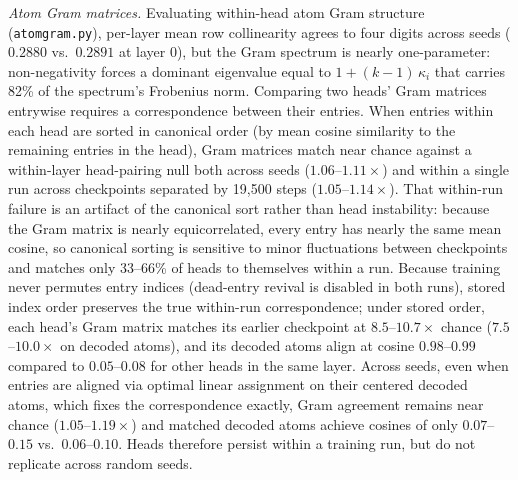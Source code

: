 \emph{Atom Gram matrices.} Evaluating within-head atom Gram structure
(\texttt{atomgram.py}), per-layer mean row collinearity agrees to four
digits across seeds ($0.2880$ vs.\ $0.2891$ at layer 0), but the Gram
spectrum is nearly one-parameter: non-negativity forces a dominant
eigenvalue equal to $1+(k-1)\,\kappa_i$ that carries 82\% of the
spectrum's Frobenius norm. Comparing two heads' Gram matrices entrywise
requires a correspondence between their entries. When entries within each
head are sorted in canonical order (by mean cosine similarity to the
remaining entries in the head), Gram matrices match near chance against a
within-layer head-pairing null both across seeds ($1.06$--$1.11\times$)
and within a single run across checkpoints separated by 19{,}500 steps
($1.05$--$1.14\times$). That within-run failure is an artifact of the
canonical sort rather than head instability: because the Gram matrix is
nearly equicorrelated, every entry has nearly the same mean cosine, so
canonical sorting is sensitive to minor fluctuations between checkpoints
and matches only 33--66\% of heads to themselves within a run. Because
training never permutes entry indices (dead-entry revival is disabled in
both runs), stored index order preserves the true within-run
correspondence; under stored order, each head's Gram matrix matches its
earlier checkpoint at $8.5$--$10.7\times$ chance ($7.5$--$10.0\times$ on
decoded atoms), and its decoded atoms align at cosine $0.98$--$0.99$
compared to $0.05$--$0.08$ for other heads in the same layer. Across
seeds, even when entries are aligned via optimal linear assignment on
their centered decoded atoms, which fixes the correspondence exactly,
Gram agreement remains near chance
($1.05$--$1.19\times$) and matched decoded atoms achieve cosines of only
$0.07$--$0.15$ vs.\ $0.06$--$0.10$. Heads therefore
persist within a training run, but do not replicate across random seeds.

